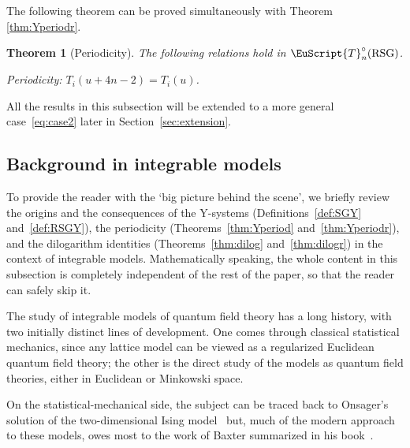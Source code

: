 \documentclass[pdftex]{sigma}
\numberwithin{equation}{section}
\newtheorem{Theorem}{Theorem}[section]
\theoremstyle{definition}
\begin{document}
The following theorem can be proved simultaneously
with Theorem \ref{thm:Yperiodr}.

\begin{Theorem}[Periodicity]
\label{thm:Tperiodr}
The following relations hold in $\EuScript{T}^{\circ}_{n}(\mathrm{RSG})$.

Periodicity: $T_i(u+4n-2)=T_i(u)$.
\end{Theorem}

All the results in this subsection will be
extended to a more general case~\eqref{eq:case2}
later in Section~\ref{sec:extension}.

\subsection{Background in integrable models}
\label{subsec:back}

To  provide the reader with the `big picture behind the scene',
we brief\/ly review
the origins and the consequences
of the Y-systems
(Def\/initions~\ref{def:SGY} and~\ref{def:RSGY}),
the periodicity (Theorems~\ref{thm:Yperiod} and~\ref{thm:Yperiodr}),
and the dilogarithm identities (Theorems~\ref{thm:dilog}
and~\ref{thm:dilogr})  in the context of integrable models.
Mathematically speaking, the  whole content in this subsection
 is completely independent
of the rest of the paper,
so that the reader can safely skip it.


The study of integrable models of quantum f\/ield theory has a long
history, with two initially distinct lines of development.
One comes through classical statistical mechanics, since any lattice model
can be viewed as a regularized Euclidean quantum f\/ield theory; the
other is the direct study of the models as quantum f\/ield theories,
either in Euclidean or Minkowski space.




On the statistical-mechanical side, the subject can be traced back
to Onsager's solution of
the two-dimensional Ising model~\cite{Onsager44} but, much of the modern approach
to these models, owes most to the work of
Baxter  summarized in his book~\cite{Baxter82}.
\end{document}
